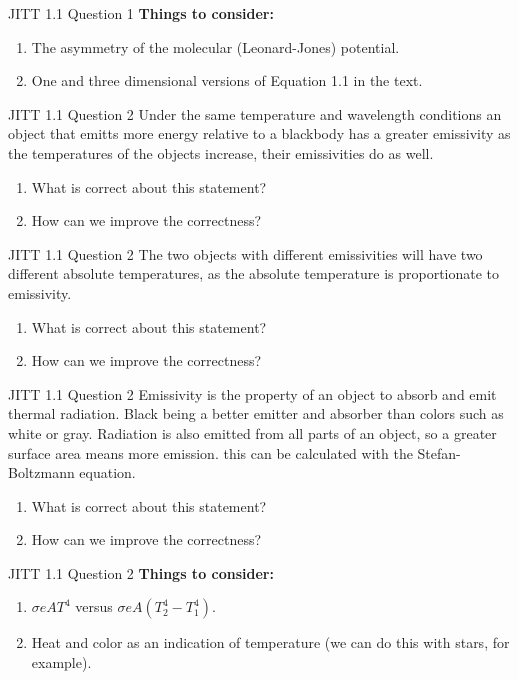 \documentclass{beamer}
\begin{document}
\begin{frame}{JITT 1.1 Question 1}
\textbf{Things to consider:} 
\begin{enumerate}
\item The asymmetry of the molecular (Leonard-Jones) potential.
\item One and three dimensional versions of Equation 1.1 in the text.
\end{enumerate}
\end{frame}

\begin{frame}{JITT 1.1 Question 2}
\small
Under the same temperature and wavelength conditions an object that emitts more energy relative to a blackbody has a greater emissivity as the temperatures of the objects increase, their emissivities do as well.
\begin{enumerate}
\item What is correct about this statement?
\item How can we improve the correctness?
\end{enumerate}
\end{frame}

\begin{frame}{JITT 1.1 Question 2}
\small
The two objects with different emissivities will have two different absolute temperatures, as the absolute temperature is proportionate to emissivity.
\begin{enumerate}
\item What is correct about this statement?
\item How can we improve the correctness?
\end{enumerate}
\end{frame}

\begin{frame}{JITT 1.1 Question 2}
\small
Emissivity is the property of an object to absorb and emit thermal radiation. Black being a better emitter and absorber than colors such as white or gray. Radiation is also emitted from all parts of an object, so a greater surface area means more emission. this can be calculated with the Stefan-Boltzmann equation.
\begin{enumerate}
\item What is correct about this statement?
\item How can we improve the correctness?
\end{enumerate}
\end{frame}

\begin{frame}{JITT 1.1 Question 2}
\textbf{Things to consider:} 
\begin{enumerate}
\item $\sigma e A T^4$ versus $\sigma e A \left( T_2^4 - T_1^4 \right)$.
\item Heat and color as an indication of temperature (we can do this with stars, for example).
\end{enumerate}
\end{frame}
\end{document}
